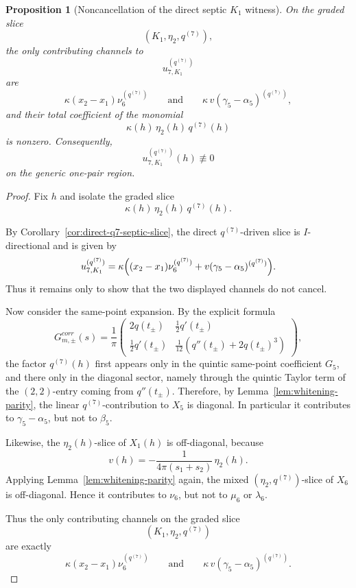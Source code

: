 \documentclass[11pt,a4paper]{amsart}
\def\corr{corr}%
\theoremstyle{plain}
\newtheorem{proposition}[theorem]{Proposition}
\theoremstyle{definition}
\newcommand{\corr}{\mathrm{corr}}
\begin{document}
\begin{proposition}[Noncancellation of the direct septic $K_1$ witness]
\label{prop:direct-q7-k1-witness-nonzero}
On the graded slice
\[
(K_1,\eta_2,q^{(7)}),
\]
the only contributing channels to
\[
u_{7,K_1}^{(q^{(7)})}
\]
are
\[
\kappa(x_2-x_1)\nu_6^{(q^{(7)})}
\qquad\text{and}\qquad
\kappa\,v(\gamma_5-\alpha_5)^{(q^{(7)})},
\]
and their total coefficient of the monomial
\[
\kappa(h)\,\eta_2(h)\,q^{(7)}(h)
\]
is nonzero. Consequently,
\[
u_{7,K_1}^{(q^{(7)})}(h)\not\equiv 0
\]
on the generic one-pair region.
\end{proposition}

\begin{proof}
Fix $h$ and isolate the graded slice
\[
\kappa(h)\,\eta_2(h)\,q^{(7)}(h).
\]

By Corollary~\ref{cor:direct-q7-septic-slice}, the direct $q^{(7)}$-driven
slice is $I$-directional and is given by
\[
u_{7,K_1}^{(q^{(7)})}
=
\kappa\Bigl(
(x_2-x_1)\nu_6^{(q^{(7)})}
+
v(\gamma_5-\alpha_5)^{(q^{(7)})}
\Bigr).
\]
Thus it remains only to show that the two displayed channels do not cancel.

Now consider the same-point expansion. By the explicit formula
\[
G_{m,\pm}^{\corr}(s)
=
\frac1\pi
\begin{pmatrix}
2q(t_\pm) & \frac12 q'(t_\pm)\\[.5ex]
\frac12 q'(t_\pm) & \frac1{12}(q''(t_\pm)+2q(t_\pm)^3)
\end{pmatrix},
\]
the factor $q^{(7)}(h)$ first appears only in the quintic same-point
coefficient $G_5$, and there only in the diagonal sector, namely through
the quintic Taylor term of the $(2,2)$-entry coming from $q''(t_\pm)$.
Therefore, by Lemma~\ref{lem:whitening-parity}, the linear
$q^{(7)}$-contribution to $X_5$ is diagonal. In particular it contributes
to $\gamma_5-\alpha_5$, but not to $\beta_5$.

Likewise, the $\eta_2(h)$-slice of $X_1(h)$ is off-diagonal, because
\[
v(h)=-\frac{1}{4\pi(s_1+s_2)}\,\eta_2(h).
\]
Applying Lemma~\ref{lem:whitening-parity} again, the mixed
$(\eta_2,q^{(7)})$-slice of $X_6$ is off-diagonal. Hence it contributes
to $\nu_6$, but not to $\mu_6$ or $\lambda_6$.

Thus the only contributing channels on the graded slice
\[
(K_1,\eta_2,q^{(7)})
\]
are exactly
\[
\kappa(x_2-x_1)\nu_6^{(q^{(7)})}
\qquad\text{and}\qquad
\kappa\,v(\gamma_5-\alpha_5)^{(q^{(7)})}.
\]


\end{proof}
\end{document}
